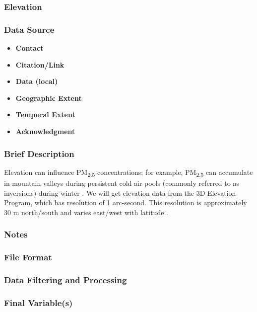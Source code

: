 	\subsubsection{Elevation}
\subsubsection*{Data Source}
\begin{itemize}[nolistsep]
\item \textbf{Contact}
\item \textbf{Citation/Link}
\item \textbf{Data (local)}
\item \textbf{Geographic Extent}
\item \textbf{Temporal Extent}
\item \textbf{Acknowledgment}
\end{itemize}
\subsubsection*{Brief Description}

Elevation can influence PM\textsubscript{2.5} concentrations; for example, PM\textsubscript{2.5} can accumulate in mountain valleys during persistent cold air pools 
(commonly referred to as inversions) 
during winter \citep{Whiteman2014}. We will get elevation data from the 3D Elevation Program, which has resolution of 1 arc-second. This resolution is approximately 30 m north/south and varies east/west with latitude \citep{USGSElevation2017}.

\subsubsection*{Notes}
\subsubsection*{File Format}
\subsubsection*{Data Filtering and Processing}
\subsubsection*{Final Variable(s)}
